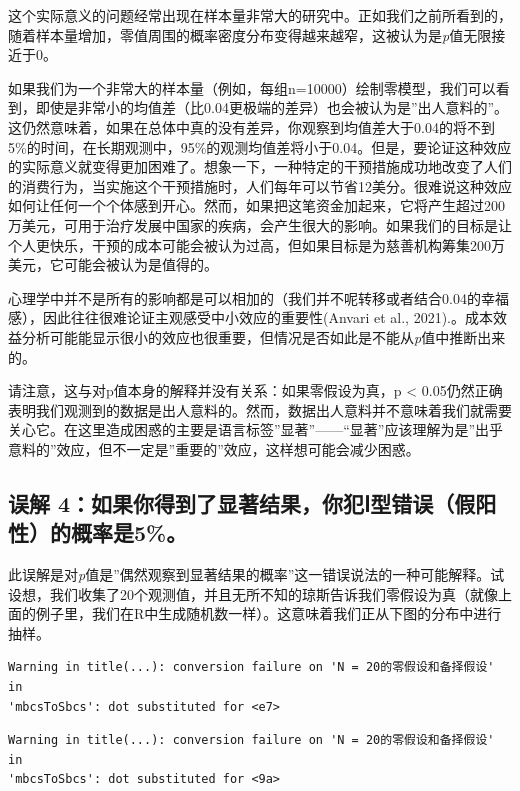 \documentclass[
  letterpaper,
  DIV=11,
  numbers=noendperiod]{scrreprt}
\begin{document}
这个实际意义的问题经常出现在样本量非常大的研究中。正如我们之前所看到的，随着样本量增加，零值周围的概率密度分布变得越来越窄，这被认为是\emph{p}值无限接近于0。

如果我们为一个非常大的样本量（例如，每组n=10000）绘制零模型，我们可以看到，即使是非常小的均值差（比0.04更极端的差异）也会被认为是''出人意料的''。这仍然意味着，如果在总体中真的没有差异，你观察到均值差大于0.04的将不到5\%的时间，在长期观测中，95\%的观测均值差将小于0.04。但是，要论证这种效应的实际意义就变得更加困难了。想象一下，一种特定的干预措施成功地改变了人们的消费行为，当实施这个干预措施时，人们每年可以节省12美分。很难说这种效应如何让任何一个个体感到开心。然而，如果把这笔资金加起来，它将产生超过200万美元，可用于治疗发展中国家的疾病，会产生很大的影响。如果我们的目标是让个人更快乐，干预的成本可能会被认为过高，但如果目标是为慈善机构筹集200万美元，它可能会被认为是值得的。

心理学中并不是所有的影响都是可以相加的（我们并不呢转移或者结合0.04的幸福感），因此往往很难论证主观感受中小效应的重要性(Anvari
et al.,
2021).。成本效益分析可能能显示很小的效应也很重要，但情况是否如此是不能从\emph{p}值中推断出来的。

请注意，这与对p值本身的解释并没有关系：如果零假设为真，p \textless{}
0.05仍然正确表明我们观测到的数据是出人意料的。然而，数据出人意料并不意味着我们就需要关心它。在这里造成困惑的主要是语言标签''显著''------``显著''应该理解为是''出乎意料的''效应，但不一定是''重要的''效应，这样想可能会减少困惑。

\hypertarget{sec-misconception4}{%
\subsection{误解
4：如果你得到了显著结果，你犯Ⅰ型错误（假阳性）的概率是5\%。}\label{sec-misconception4}}

此误解是对\emph{p}值是''偶然观察到显著结果的概率''这一错误说法的一种可能解释。试设想，我们收集了20个观测值，并且无所不知的琼斯告诉我们零假设为真（就像上面的例子里，我们在R中生成随机数一样）。这意味着我们正从下图的分布中进行抽样。

\begin{verbatim}
Warning in title(...): conversion failure on 'N = 20的零假设和备择假设' in
'mbcsToSbcs': dot substituted for <e7>
\end{verbatim}

\begin{verbatim}
Warning in title(...): conversion failure on 'N = 20的零假设和备择假设' in
'mbcsToSbcs': dot substituted for <9a>
\end{verbatim}
\end{document}

